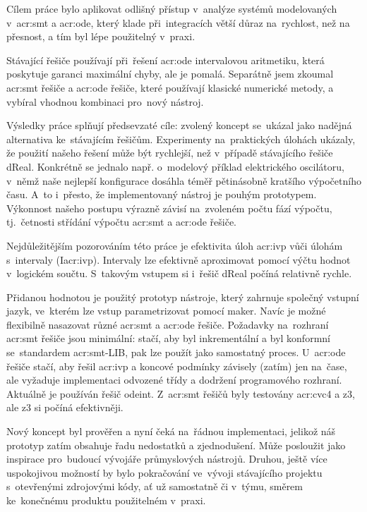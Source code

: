 \documentclass[thesis=M,czech]{FITthesis}[2012/06/26]
\newcommand{\acrlabel}[1]{acr:#1}
\newcommand{\acr}[1]{\acrshort{\acrlabel{#1}}}
\begin{document}

\begin{conclusion}\label{ch:outro}
Cílem práce bylo aplikovat odlišný přístup
v~analýze systémů modelovaných
v~\acr{smt} a \acr{ode},
který klade při~integracích větší
důraz na~rychlost, než na přesnost,
a tím byl lépe použitelný v~praxi.

Stávající řešiče používají při~řešení \acr{ode}
intervalovou aritmetiku, která poskytuje
garanci maximální chyby,
ale je pomalá.
Separátně jsem zkoumal \acr{smt} řešiče
a \acr{ode} řešiče, které používají
klasické numerické metody,
a vybíral vhodnou kombinaci
pro~nový nástroj.

Výsledky práce splňují předsevzaté cíle:
zvolený koncept se~ukázal jako nadějná
alternativa ke~stávajícím řešičům.
Experimenty na~praktických úlohách ukázaly,
že použití našeho řešení
může být rychlejší,
než v~případě stávajícího řešiče dReal.
Konkrétně se jednalo např. o~modelový příklad
elektrického oscilátoru,
v~němž naše nejlepší konfigurace dosáhla
téměř pětinásobně kratšího výpočetního času.
A~to i~přesto, že implementovaný nástroj
je pouhým prototypem.
Výkonnost našeho postupu výrazně závisí
na~zvoleném počtu fází výpočtu,
tj.~četnosti střídání výpočtu \acr{smt} a \acr{ode} řešiče.

Nejdůležitějším pozorováním této práce
je efektivita úloh \acr{ivp}
vůči úlohám s~intervaly (I\acr{ivp}).
Intervaly lze efektivně aproximovat
pomocí výčtu hodnot v~logickém součtu.
S~takovým vstupem si i~řešič dReal
počíná relativně rychle.

Přidanou hodnotou je použitý prototyp nástroje,
který zahrnuje společný vstupní jazyk,
ve~kterém lze vstup parametrizovat pomocí maker.
Navíc je možné flexibilně
nasazovat různé \acr{smt} a \acr{ode} řešiče.
Požadavky na~rozhraní \acr{smt} řešiče
jsou minimální: stačí, aby byl inkrementální
a byl konformní se~standardem \acr{smt}-LIB,
pak lze použít jako samostatný proces.
U~\acr{ode} řešiče stačí, aby řešil \acr{ivp}
a koncové podmínky závisely (zatím) jen na~čase,
ale vyžaduje implementaci
odvozené třídy a dodržení programového rozhraní.
Aktuálně je používán řešič odeint.
Z~\acr{smt} řešičů byly testovány
\acr{cvc}4 a z3,
ale z3 si počíná efektivněji.

Nový koncept byl prověřen a nyní čeká
na~řádnou implementaci,
jelikož náš prototyp zatím obsahuje řadu nedostatků a zjednodušení.
Může posloužit jako inspirace pro~budoucí vývojáře
průmyslových nástrojů.
Druhou, ještě více uspokojivou možností
by bylo pokračování ve~vývoji stávajícího projektu
s~otevřenými zdrojovými kódy,
ať už samostatně či v~týmu,
směrem ke~konečnému produktu použitelném v~praxi.
\end{conclusion}
\end{document}
